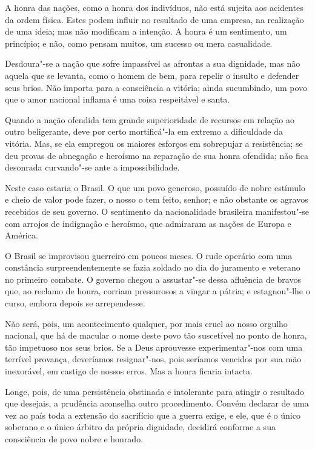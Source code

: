 \begin{linenumbers}

A honra das nações, como a honra dos indivíduos, não está sujeita aos
acidentes da ordem física. Estes podem influir no resultado de uma
empresa, na realização de uma ideia; mas não modificam a intenção. A
honra é um sentimento, um princípio; e não, como pensam muitos, um
sucesso ou mera casualidade. 

Desdoura"-se a nação que sofre impassível as afrontas a sua dignidade,
mas não aquela que se levanta, como o homem de bem, para repelir o
insulto e defender seus brios. Não importa para a consciência a
vitória; ainda sucumbindo, um povo que o amor nacional inflama é uma
coisa respeitável e santa. 

Quando a nação ofendida tem grande superioridade de recursos em relação
ao outro beligerante, deve por certo mortificá"-la em extremo a
dificuldade da vitória. Mas, se ela empregou os maiores esforços em
sobrepujar a resistência; se deu provas de abnegação e heroísmo na
reparação de sua honra ofendida; não fica desonrada curvando"-se ante a impossibilidade. 

Neste caso estaria o Brasil. O que um povo generoso, possuído de nobre
estímulo e cheio de valor pode fazer, o nosso o tem feito, senhor; e
não obstante os agravos recebidos de seu governo. O sentimento da
nacionalidade brasileira manifestou"-se com arrojos de indignação e
heroísmo, que admiraram as nações de Europa e América.

O Brasil se improvisou guerreiro em poucos meses. O rude operário com
uma constância surpreendentemente se fazia soldado no dia do juramento
e veterano no primeiro combate. O governo chegou a assustar"-se dessa
afluência de bravos que, ao reclamo de honra, corriam pressurosos a
vingar a pátria; e estagnou"-lhe o curso, embora depois se arrependesse. 

Não será, pois, um acontecimento qualquer, por mais cruel ao nosso
orgulho nacional, que há de macular o nome deste povo tão suscetível no
ponto de honra, tão impetuoso nos seus brios. Se a Deus aprouvesse
experimentar"-nos com uma terrível provança, deveríamos
resignar"-nos, pois seríamos vencidos por sua mão inexorável, em
castigo de nossos erros. Mas a honra ficaria intacta. 

Longe, pois, de uma persistência obstinada e intolerante para atingir o
resultado que desejais, a prudência aconselha outro procedimento.
Convém declarar de uma vez ao país toda a extensão do sacrifício que a
guerra exige, e ele, que é o único soberano e o único árbitro da
própria dignidade, decidirá conforme a sua consciência de povo nobre e honrado. 


\end{linenumbers}

